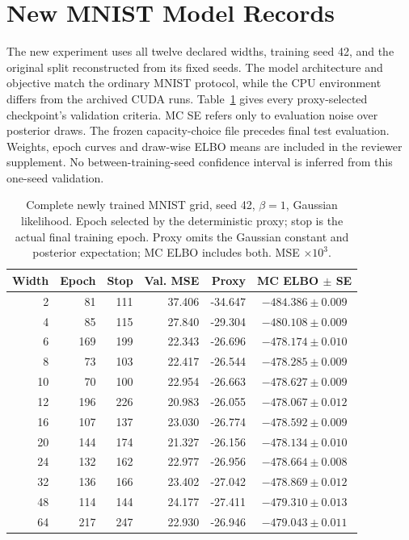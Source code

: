 \documentclass[make,article,submit,pdftex,moreauthors]{Definitions/mdpi}
\begin{document}
\section{New MNIST Model Records}\label{app:newmodels}
The new experiment uses all twelve declared widths, training seed 42,
and the original split reconstructed from its fixed seeds. The model
architecture and objective match the ordinary MNIST protocol, while
the CPU environment differs from the archived CUDA runs.
Table~\ref{tab:mcgrid} gives every proxy-selected checkpoint's validation
criteria. MC SE refers only to evaluation noise over posterior draws.
The frozen capacity-choice file precedes final test evaluation.
Weights, epoch curves and draw-wise ELBO means are included in the
reviewer supplement. No between-training-seed confidence interval is
inferred from this one-seed validation.
\begin{table}[H]
\caption{Complete newly trained MNIST grid, seed 42, $\beta=1$, Gaussian likelihood. Epoch selected by the deterministic proxy; stop is the actual final training epoch. Proxy omits the Gaussian constant and posterior expectation; MC ELBO includes both. MSE $\times10^3$.}\label{tab:mcgrid}
\small
\setlength{\tabcolsep}{3pt}
\begin{tabular*}{\textwidth}{@{\extracolsep{\fill}}rrrrrc@{}}
\toprule
Width & Epoch & Stop & Val. MSE & Proxy & MC ELBO $\pm$ SE \\
\midrule
2 & 81 & 111 & 37.406 & -34.647 & $-484.386 \pm 0.009$ \\
4 & 85 & 115 & 27.840 & -29.304 & $-480.108 \pm 0.009$ \\
6 & 169 & 199 & 22.343 & -26.696 & $-478.174 \pm 0.010$ \\
8 & 73 & 103 & 22.417 & -26.544 & $-478.285 \pm 0.009$ \\
10 & 70 & 100 & 22.954 & -26.663 & $-478.627 \pm 0.009$ \\
12 & 196 & 226 & 20.983 & -26.055 & $-478.067 \pm 0.012$ \\
16 & 107 & 137 & 23.030 & -26.774 & $-478.592 \pm 0.009$ \\
20 & 144 & 174 & 21.327 & -26.156 & $-478.134 \pm 0.010$ \\
24 & 132 & 162 & 22.977 & -26.956 & $-478.664 \pm 0.008$ \\
32 & 136 & 166 & 23.402 & -27.042 & $-478.869 \pm 0.012$ \\
48 & 114 & 144 & 24.177 & -27.411 & $-479.310 \pm 0.013$ \\
64 & 217 & 247 & 22.930 & -26.946 & $-479.043 \pm 0.011$ \\
\bottomrule\end{tabular*}
\end{table}
\end{document}
